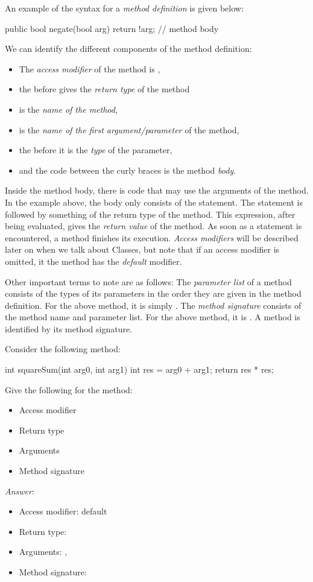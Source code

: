 An example of the syntax for a \emph{method definition} is given below:
\begin{code}
public bool negate(bool arg) {
  return !arg; // method body
}
\end{code}
We can identify the different components of the method definition:
\begin{itemize}
\item  The \emph{access modifier} of the method is ,
\item the  before  gives the \emph{return type} of the method
\item {} is the \emph{name of the method},
\item {} is the \emph{name of the first argument/parameter} of the method,
\item the  before  it is the \emph{type} of the  parameter,
\item and the code between the curly braces is the method \emph{body}.
\end{itemize}
Inside the method body, there is code that may use the arguments of the method.
In the example above, the body only consists of the  statement.
The  statement is followed by something of the return type of the method.
This expression, after being evaluated, gives the \emph{return value} of the method.
As soon as a  statement is encountered, a method finishes its execution.
\emph{Access modifiers} will be described later on when we talk about Classes,
but note that if an access modifier is omitted, it the method has the \emph{default} modifier.

Other important terms to note are as follows:
The \emph{parameter list} of a method consists of the types of its parameters in the
order they are given in the method definition.
For the above method, it is simply .
The \emph{method signature} consists of the method name and parameter list.
For the above method, it is .
A method is identified by its method signature.

\begin{example}
Consider the following method:
\begin{code}
int squareSum(int arg0, int arg1) {
  int res = arg0 + arg1;
  return res * res;
}
\end{code}
Give the following for the method:
\begin{itemize}
\item Access modifier
\item Return type
\item Arguments
\item Method signature
\end{itemize}

\noindent \emph{Answer}: 
\begin{itemize}
\item Access modifier: default
\item Return type: 
\item Arguments: , 
\item Method signature: 
\end{itemize}
\end{example}


